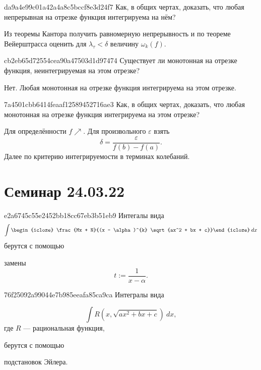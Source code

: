 \begin{note}{da9a4e99c01a42a4a8c5bccf8e3d24f7}
    Как, в общих чертах, доказать, что любая непрерывная на отрезке функция интегрируема на нём?

    \begin{cloze}{1}
        Из теоремы Кантора получить равномерную непрерывность и по теореме Вейерштрасса оценить для \({ \lambda_\tau < \delta }\) величину \({ \omega_k(f) }\).
    \end{cloze}
\end{note}

\begin{note}{cb2eb65d72554cea90a47503d1d97474}
    Существует ли монотонная на отрезке функция, неинтегрируемая на этом отрезке?

    \begin{cloze}{1}
        Нет. Любая монотонная на отрезке функция интегрируема на этом отрезке.
    \end{cloze}
\end{note}

\begin{note}{7a4501cbb6414feaaf12589452716ae3}
    Как, в общих чертах, доказать, что любая монотонная на отрезке функция интегрируема на этом отрезке?

    \begin{cloze}{1}
        Для определённости \({ f \!\!\nearrow }\). Для произвольного \({ \varepsilon }\) взять
        \[
            \delta = \frac{\varepsilon}{f(b) - f(a)}.
        \]
        Далее по критерию интегрируемости в терминах колебаний.
    \end{cloze}
\end{note}

\section{Семинар 24.03.22}
\begin{note}{e2a6745c55e2452bb18cc67eb3b51eb9}
    Интегалы вида
    \[
        \int \begin{icloze}{2}\frac{Mx + N}{(x - \alpha)^{k} \sqrt{ax^2 + bx + c}}\end{icloze}\: dx
    \]
    берутся с помощью
    \begin{icloze}{1}замены
        \[
            t := \frac{1}{x - \alpha}.
        \]
    \end{icloze}
\end{note}

\begin{note}{76f25092a99044e7b985eeafa85ca9ca}
    Интегралы вида \begin{icloze}{2}
    \[
        \int R(x, \sqrt{ax^2 + bx + c})\: dx,
    \]
    где \({ R }\) --- рациональная функция,\end{icloze} берутся с помощью \begin{icloze}{1}подстановок Эйлера.\end{icloze}
\end{note}

